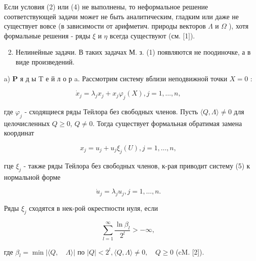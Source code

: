 \documentclass[10pt]{article}
\begin{document}
Если условия (2) или (4) не выполнены, то неформальное решение соответствующей задачи может не быть аналитическим, гладким или даже не существует вовсе (в зависимости от арифметич. природы векторов $\Lambda$ и $\Omega$ ), хотя формальные решения - ряды $\xi$ и $\eta$ всегда существуют (см. [1]).



\begin{enumerate}

  \setcounter{enumi}{1}

  \item Нелинейные задачи. В таких задачах М. з. (1) появляются не поодиночке, а в виде произведений.

\end{enumerate}



a) $\mathbf{P}$ я д ы $\mathrm{T}$ е й л о р a. Рассмотрим систему вблизи неподвижной точки $X=0$ :



\[

\dot{x}_{j}=\lambda_{j} x_{j}+x_{j} \varphi_{j}(X), j=1, \ldots, n,

\]



где $\varphi_{j}$ - сходящиеся ряды Тейлора без свободных членов. Пусть $\langle Q, \Lambda\rangle \neq 0$ для целочисленных $Q \geqslant 0$, $Q \neq 0$. Тогда существует формальная обратимая замена координат



\[

x_{j}=u_{j}+u_{j} \xi_{j}(U), j=1, \ldots, n,

\]



гце $\xi_{j}$ - также ряды Тейлора без свободных членов, к-рая приводит систему (5) к нормальной форме



\[

\dot{u}_{j}=\lambda_{j} u_{j}, j=1, \ldots, n .

\]



Ряды $\xi_{j}$ сходятся в нек-рой окрестности нуля, если



\[

\sum_{l=1}^{\infty} \frac{\ln \beta_{l}}{2^{l}}>-\infty,

\]



где $\beta_{l}=\min |\langle Q, \quad \Lambda\rangle|$ по $|Q|<2^{l},\langle Q, \Lambda\rangle \neq 0, \quad Q \geqslant 0$ (cM. [2]).
\end{document}
